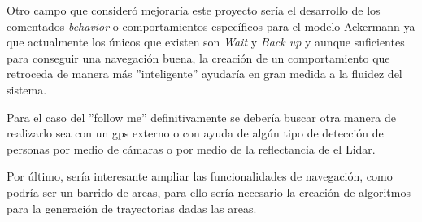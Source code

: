 Otro campo que consideró mejoraría este proyecto sería el desarrollo de los comentados \textit{behavior} o comportamientos específicos para 
el modelo Ackermann ya que actualmente los únicos que existen son \textit{Wait} y \textit{Back up} y aunque suficientes para conseguir una navegación buena,
la creación de un comportamiento que retroceda de manera más ''inteligente'' ayudaría en gran medida a la fluidez del sistema.

Para el caso del ''follow me'' definitivamente se debería buscar otra manera de realizarlo sea con un gps externo o con ayuda de algún tipo de 
detección de personas por medio de cámaras o por medio de la reflectancia de el Lidar.

Por último, sería interesante ampliar las funcionalidades de navegación, como podría ser un barrido de areas, para ello sería necesario 
la creación de algoritmos para la generación de trayectorias dadas las areas.